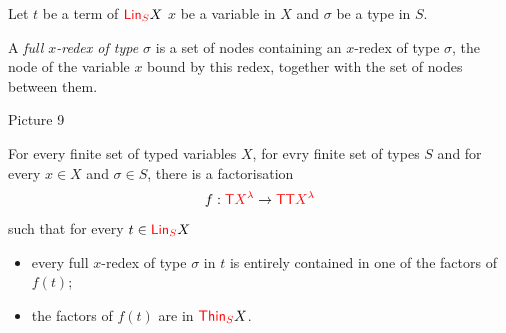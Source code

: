 \begin{definition}
Let $t$ be a term of ${\color{red}{\mathsf{Lin}_{S}}} X$ $x$ be a variable in $X$ and $\sigma$ be a type in $S$. 

 A \emph{full $x$-redex of type $\sigma$} is a set of nodes  containing an $x$-redex of type $\sigma$, the node of the variable $x$ bound by this redex, together with the set of nodes between them.
\end{definition}
\begin{center}
Picture 9
\end{center}


\begin{proposition}\label{prop:FactoIntoThin} For every finite set of typed variables $X$, for evry finite set of types $S$ and for every $x\in X$ and $\sigma\in S$, there is a factorisation $$f:{\color{red}{\mathsf T}} {\color{red}{X^\lambda}} \to {\color{red}{\mathsf T}}{\color{red}{\mathsf T}} {\color{red}{X^\lambda}}$$ 
such that for every $t\in{\color{red}{\mathsf{Lin}_{S}}} X$
\begin{itemize}
\item every full $x$-redex of type $\sigma$ in $t$ is entirely contained in one of the factors of $f(t)$;
\item the factors of $f(t)$ are in ${\color{red}{\mathsf{Thin}_{S}}} X$.
\end{itemize}
\end{proposition}

